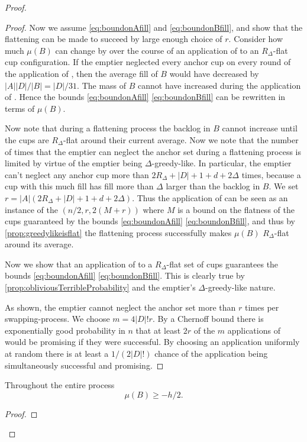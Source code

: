 \begin{proof}
\begin{proof}
  Now we assume \eqref{eq:boundonAfill} and
  \eqref{eq:boundonBfill}, and show that the flattening can be
  made to succeed by large enough choice of $r$. 
  Consider how much $\mu(B)$ can change by over the course of an
  application of \randalg to an $R_\Delta$-flat cup configuration.
  If the emptier neglected every anchor cup on every round of the
  application of \randalg, then the average fill of $B$ would have
  decreased by $|A||D|/|B| = |D|/31$. The mass of $B$ cannot have
  increased during the application of \randalg.
  Hence the bounds \eqref{eq:boundonAfill}
  \eqref{eq:boundonBfill} can be rewritten in terms of $\mu(B)$.

  Now note that during a flattening process the backlog in $B$
  cannot increase until the cups are $R_\Delta$-flat around their
  current average. Now we note that the number of times that the
  emptier can neglect the anchor set during a flattening process
  is limited by virtue of the emptier being $\Delta$-greedy-like.
  In particular, the emptier can't neglect any anchor cup more
  than $2R_\Delta + |D| + 1 + d + 2\Delta$ times, because a cup
  with this much fill has fill more than $\Delta$ larger than the
  backlog in $B$. We set $r = |A|(2R_\Delta + |D| + 1 +
  d + 2\Delta)$. Thus the application of \flatalg can be seen as an instance of the
  $(n/2, r, 2(M + r))$ where $M$ is a bound on the flatness of
  the cups guaranteed by the bounds \eqref{eq:boundonAfill}
  \eqref{eq:boundonBfill}, and thus by
  \cref{prop:greedylikeisflat} the flattening process
  successfully makes $\mu(B)$ $R_\Delta$-flat around its average.

  Now we show that an application of \randalg to a
  $R_\Delta$-flat set of cups guarantees the bounds
  \eqref{eq:boundonAfill} \eqref{eq:boundonBfill}.
  This is clearly true by
  \cref{prop:obliviousTerribleProbability} and
  the emptier's $\Delta$-greedy-like nature.

  As shown, the emptier cannot neglect the anchor set more than
  $r$ times per swapping-process. We choose $m = 4|D|! r$. By a
  Chernoff bound there is exponentially good probability in $n$
  that at least $2r$ of the $m$ applications of \randalg would be
  promising if they were successful. By choosing an application
  uniformly at random there is at least a $1/(2|D|!)$ chance of
  the application being simultaneously successful and promising. 

\end{proof}

\begin{clm}
  \label{clm:muBdoesntSinkTooLow}
  Throughout the entire process
  $$\mu(B) \ge -h/2.$$
\end{clm}
\begin{proof}


\end{proof}
\end{proof}
